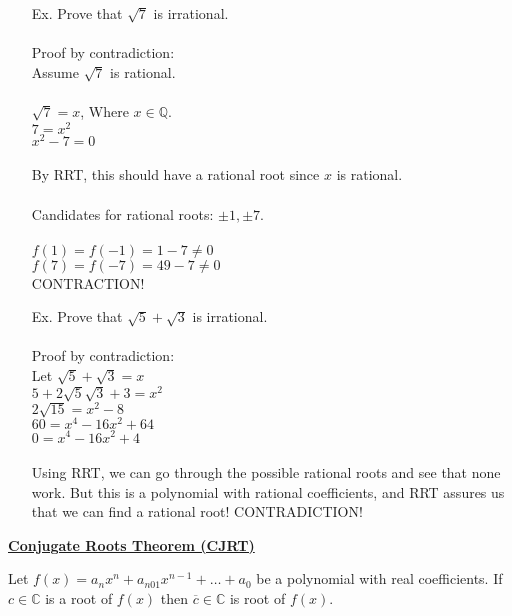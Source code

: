 \documentclass{letter}
\begin{document}
\begin{itemize}
		\item[Ex. ] Prove that $\sqrt 7$ is irrational.\\\\
		Proof by contradiction:\\
		Assume $\sqrt 7$ is rational.\\\\
		$\sqrt 7 = x$, Where $x \in \mathbb{Q}$.\\
		$7 = x^2$\\
		$x^2 - 7 = 0$\\\\
		By RRT, this should have a rational root since $x$ is rational.\\\\
		Candidates for rational roots: $\pm 1, \pm 7$.\\\\
		$f(1) = f(-1) = 1-7 \neq 0$\\
		$f(7) = f(-7) = 49 - 7 \neq 0$\\
		CONTRACTION!\\
		
		\item[Ex. ] Prove that $\sqrt 5 + \sqrt 3$ is irrational.\\\\
		Proof by contradiction:\\
		Let $\sqrt 5 + \sqrt 3 = x$\\
		$5 + 2\sqrt5 \sqrt 3 + 3 = x^2$\\
		$2 \sqrt{15} = x^2 - 8$\\
		$60 = x^4 - 16x^2 + 64$\\
		$0 = x^4 - 16x^2 + 4$\\\\
		Using RRT, we can go through the possible rational roots and see that none work. But this is a polynomial with rational coefficients, and RRT assures us that we can find a rational root! CONTRADICTION!
	\end{itemize}
	
	\underline{\textbf{Conjugate Roots Theorem (CJRT)}}
	
	Let $f(x) = a_nx^n + a_{n01}x^{n-1} + \dots + a_0$ be a polynomial with real coefficients. If $c \in \mathbb{C}$ is a root of $f(x)$ then $\overline{c} \in \mathbb{C}$ is root of $f(x)$.
\end{document}
